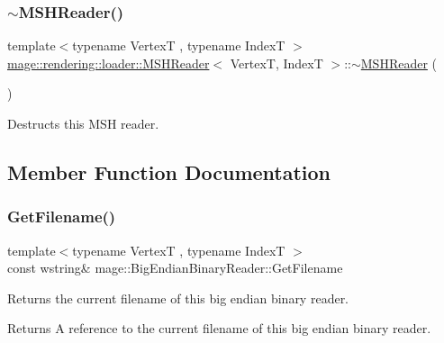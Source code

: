 \subsubsection{\texorpdfstring{$\sim$\+M\+S\+H\+Reader()}{~MSHReader()}}
{\footnotesize\ttfamily template$<$typename VertexT , typename IndexT $>$ \\
\mbox{\hyperlink{classmage_1_1rendering_1_1loader_1_1_m_s_h_reader}{mage\+::rendering\+::loader\+::\+M\+S\+H\+Reader}}$<$ VertexT, IndexT $>$\+::$\sim$\mbox{\hyperlink{classmage_1_1rendering_1_1loader_1_1_m_s_h_reader}{M\+S\+H\+Reader}} (\begin{DoxyParamCaption}{ }\end{DoxyParamCaption})}

Destructs this M\+SH reader. 

\subsection{Member Function Documentation}
\mbox{\label{classmage_1_1rendering_1_1loader_1_1_m_s_h_reader_a801558f27606dbc681809178aaaaacd1}} 
\subsubsection{\texorpdfstring{Get\+Filename()}{GetFilename()}}
{\footnotesize\ttfamily template$<$typename VertexT , typename IndexT $>$ \\
const wstring\& mage\+::\+Big\+Endian\+Binary\+Reader\+::\+Get\+Filename\hspace{0.3cm}{\ttfamily [noexcept]}}

Returns the current filename of this big endian binary reader.

\begin{DoxyReturn}{Returns}
A reference to the current filename of this big endian binary reader. 
\end{DoxyReturn}
\mbox{\label{classmage_1_1rendering_1_1loader_1_1_m_s_h_reader_a7e6948dfb5f5c672719ebe10c4dae6bf}} 
